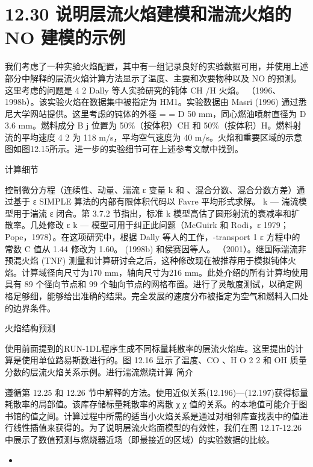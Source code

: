 \documentclass[11pt,a4paper,openany,fontset=none]{ctexbook}
\begin{document}
\section*{12.30 说明层流火焰建模和湍流火焰的 NO 建模的示例}

我们考虑了一种实验火焰配置，其中有一组记录良好的实验数据可用，并使用上述部分中解释的层流火焰计算方法显示了温度、主要和次要物种以及 NO 的预测。这里考虑的问题是 4 2 Dally 等人实验研究的钝体 CH /H 火焰。 （1996、1998b）。该实验火焰在数据集中被指定为 HM1。实验数据由 Masri (1996) 通过悉尼大学网站提供。这里考虑的钝体的外径 = = D 50 mm，同心燃油喷射直径为 D 3.6 mm。燃料成分 B j 位置为 50\%（按体积）CH 和 50\%（按体积）H。燃料射流的平均速度 4 2 为 118 m/s，平均空气速度为 40 m/s。火焰和重要区域的示意图如图12.15所示。进一步的实验细节可在上述参考文献中找到。

计算细节

控制微分方程（连续性、动量、湍流 ε 变量 k 和 、混合分数、混合分数方差）通过基于 ε SIMPLE 算法的内部有限体积代码以 Favre 平均形式求解。 k — 湍流模型用于湍流 ε 闭合。第 3.7.2 节指出，标准 k 模型高估了圆形射流的衰减率和扩散率。几处修改
ε k — 模型可用于纠正此问题（McGuirk 和 Rodi，ε 1979；Pope，1978）。在这项研究中，根据 Dally 等人的工作，-transport 1 ε 方程中的常数 C 值从 1.44 修改为 1.60。 (1998b) 和侯赛因等人。 （2001）。继国际湍流非预混火焰 (TNF) 测量和计算研讨会之后，这种修改现在被推荐用于模拟钝体火焰。计算域径向尺寸为170 mm，轴向尺寸为216 mm。此处介绍的所有计算均使用具有 89 个径向节点和 99 个轴向节点的网格布置。进行了灵敏度测试，以确定网格足够细，能够给出准确的结果。完全发展的速度分布被指定为空气和燃料入口处的边界条件。

火焰结构预测

使用前面提到的RUN-1DL程序生成不同标量耗散率的层流火焰库。这里提出的计算是使用单位路易斯数进行的。图 12.16 显示了温度、CO 、H O 2 2 和 OH 质量分数的层流火焰关系示例。进行湍流燃烧计算
简介

遵循第 12.25 和 12.26 节中解释的方法。使用近似关系(12.196)—(12.197)获得标量耗散率的局部值。该库存储标量耗散率的离散 χ χ 值的关系。的本地值可能介于图书馆的值之间。计算过程中所需的适当小火焰关系是通过对相邻库查找表中的值进行线性插值来获得的。为了说明层流火焰面模型的有效性，我们在图 12.17-12.26 中展示了数值预测与燃烧器近场（即最接近的区域）的实验数据的比较。

\begin{itemize}

\item 

\end{itemize}
\end{document}
